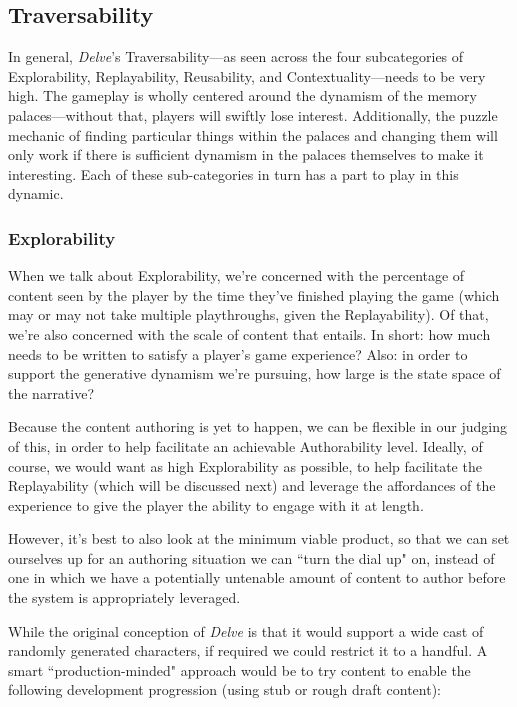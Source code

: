 \subsection{Traversability}\label{subsec:delve-traversability}

In general, \textit{Delve}'s Traversability---as seen across the four subcategories of Explorability, Replayability, Reusability, and Contextuality---needs to be very high. The gameplay is wholly centered around the dynamism of the memory palaces---without that, players will swiftly lose interest. Additionally, the puzzle mechanic of finding particular things within the palaces and changing them will only work if there is sufficient dynamism in the palaces themselves to make it interesting. Each of these sub-categories in turn has a part to play in this dynamic.

\subsubsection{Explorability}\label{subsubsec:delve-explorability}

When we talk about Explorability, we're concerned with the percentage of content seen by the player by the time they've finished playing the game (which may or may not take multiple playthroughs, given the Replayability). Of that, we're also concerned with the scale of content that entails. In short: how much needs to be written to satisfy a player's game experience? Also: in order to support the generative dynamism we're pursuing, how large is the state space of the narrative?

Because the content authoring is yet to happen, we can be flexible in our judging of this, in order to help facilitate an achievable Authorability level. Ideally, of course, we would want as high Explorability as possible, to help facilitate the Replayability (which will be discussed next) and leverage the affordances of the experience to give the player the ability to engage with it at length.

However, it's best to also look at the minimum viable product, so that we can set ourselves up for an authoring situation we can ``turn the dial up" on, instead of one in which we have a potentially untenable amount of content to author before the system is appropriately leveraged.

While the original conception of \textit{Delve} is that it would support a wide cast of randomly generated characters, if required we could restrict it to a handful. A smart ``production-minded" approach would be to try content to enable the following development progression (using stub or rough draft content):

